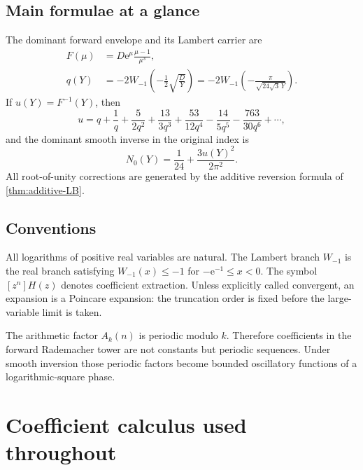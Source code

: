 \documentclass[11pt]{article}
\numberwithin{equation}{section}
\theoremstyle{mainthm}
\theoremstyle{defstyle}
\theoremstyle{remark}
\newcommand{\e}{\mathrm e}
\begin{document}
\subsection{Main formulae at a glance}

\begin{resultbox}
The dominant forward envelope and its Lambert carrier are
\begin{align}
 F(\mu)&=D\e^\mu\frac{\mu-1}{\mu^3},\label{eq:F-intro}\\
 q(Y)&=-2W_{-1}\!\left(-\frac12\sqrt{\frac{D}{Y}}\right)
      =-2W_{-1}\!\left(-\frac{\pi}{\sqrt{24\sqrt3\,Y}}\right).
 \label{eq:q-intro}
\end{align}
If \(u(Y)=F^{-1}(Y)\), then
\begin{equation}\label{eq:u-intro}
 u=q+\frac1q+\frac{5}{2q^2}+\frac{13}{3q^3}
   +\frac{53}{12q^4}-\frac{14}{5q^5}-\frac{763}{30q^6}+\cdots,
\end{equation}
and the dominant smooth inverse in the original index is
\begin{equation}\label{eq:N0-intro}
 N_0(Y)=\frac1{24}+\frac{3u(Y)^2}{2\pi^2}.
\end{equation}
All root-of-unity corrections are generated by the additive reversion formula of \cref{thm:additive-LB}.
\end{resultbox}

\subsection{Conventions}

All logarithms of positive real variables are natural.  The Lambert branch \(W_{-1}\) is the real branch satisfying \(W_{-1}(x)\le-1\) for \(-\e^{-1}\le x<0\).  The symbol \([z^n]H(z)\) denotes coefficient extraction.  Unless explicitly called convergent, an expansion is a Poincare expansion: the truncation order is fixed before the large-variable limit is taken.

The arithmetic factor \(A_k(n)\) is periodic modulo \(k\).  Therefore coefficients in the forward Rademacher tower are not constants but periodic sequences.  Under smooth inversion those periodic factors become bounded oscillatory functions of a logarithmic-square phase.

\section{Coefficient calculus used throughout}\label{sec:coefficient-calculus}
\end{document}
